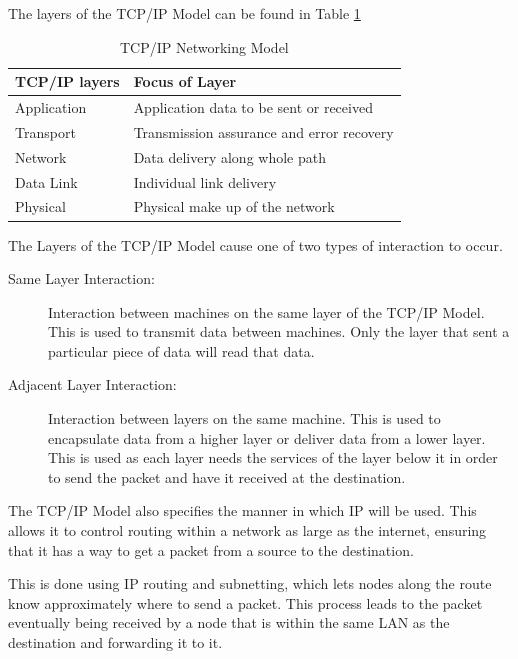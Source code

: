		The layers of the TCP/IP Model can be found in Table \ref{tab:TCPIPModel}
		\begin{table}[htb]
			\centering
				\begin{adjustbox}{max width=1\textwidth}
			\begin{tabular}{l l }
				\toprule
				\textbf{TCP/IP layers} & \textbf{Focus of Layer}\\
				\toprule
				Application & Application data to be sent or received\\
				Transport & Transmission assurance and error recovery\\
				Network & Data delivery along whole path\\
				Data Link & Individual link delivery\\
				Physical & Physical make up of the network\\
				\bottomrule
			\end{tabular}
		\end{adjustbox}
			\caption{TCP/IP Networking Model}
			\label{tab:TCPIPModel}
		\end{table}

		The Layers of the TCP/IP Model cause one of two types of interaction to occur.
		\begin{description}
			\item[Same Layer Interaction:] Interaction between machines on the same layer of the TCP/IP Model.
				This is used to transmit data between machines.
				Only the layer that sent a particular piece of data will read that data.
			\item[Adjacent Layer Interaction:] Interaction between layers on the same machine.
				This is used to encapsulate data from a higher layer or deliver data from a lower layer.
				This is used as each layer needs the services of the layer below it in order to send the packet and have it received at the destination.
		\end{description}

		The TCP/IP Model also specifies the manner in which IP will be used.
		This allows it to control routing within a network as large as the internet,
		ensuring that it has a way to get a packet from a source to the destination.

		This is done using IP routing and subnetting, which lets nodes along the route know approximately where to send a packet.
		This process leads to the packet eventually being received by a node that is within the same LAN as the destination and forwarding it to it.


